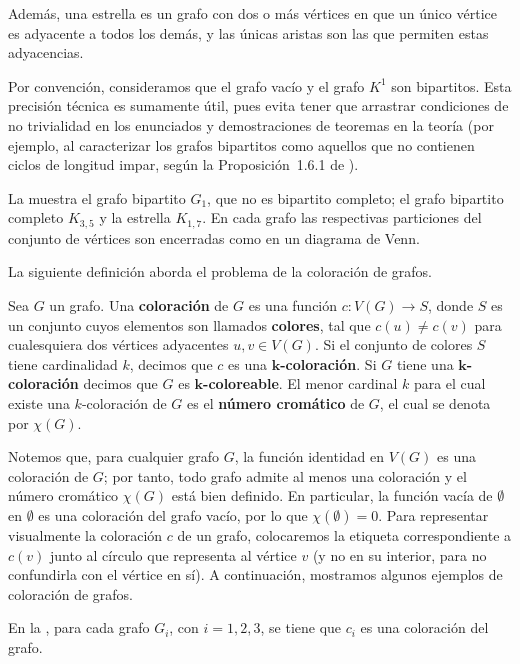 Además, una estrella es un grafo con dos o más vértices en que un único vértice es adyacente a todos los demás, y las únicas aristas son las que permiten estas adyacencias.
\begin{Obs}
    Por convención, consideramos que el grafo vacío y el grafo $K^1$ son bipartitos. Esta precisión técnica es sumamente útil, pues evita tener que arrastrar condiciones de no trivialidad en los enunciados y demostraciones de teoremas en la teoría (por ejemplo, al caracterizar los grafos bipartitos como aquellos que no contienen ciclos de longitud impar, según la Proposición~1.6.1 de \cite{diestel2017}).
\end{Obs}
\begin{Ejm}
   La  muestra el grafo bipartito $G_1$, que no es bipartito completo; el grafo bipartito completo $K_{3,5}$ y la estrella $K_{1,7}$. En cada grafo las respectivas particiones del conjunto de vértices son encerradas como en un diagrama de Venn.
   
\end{Ejm}
La siguiente definición aborda el problema de la coloración de grafos.
\begin{Def}
   Sea $G$ un grafo. Una \textbf{coloración} de $G$ es una función $c: V(G) \to S$, donde $S$ es un conjunto cuyos elementos son llamados \textbf{colores}, tal que $c(u) \neq c(v)$ para cualesquiera dos vértices adyacentes $u, v \in V(G)$. Si el conjunto de colores $S$ tiene cardinalidad $k$, decimos que $c$ es una \textbf{$\bm{k}$-coloración}. Si $G$ tiene una \textbf{$\bm{k}$-coloración} decimos que $G$ es \textbf{$\bm{k}$-coloreable}. El menor cardinal $k$ para el cual existe una $k$-coloración de $G$ es el \textbf{número cromático} de $G$, el cual se denota por $\chi(G)$.
\end{Def}
Notemos que, para cualquier grafo $G$, la función identidad en $V(G)$ es una coloración de $G$; por tanto, todo grafo admite al menos una coloración y el número cromático $\chi(G)$ está bien definido. En particular, la función vacía de $\emptyset$ en $\emptyset$ es una coloración del grafo vacío, por lo que $\chi(\emptyset) = 0$. Para representar visualmente la coloración $c$ de un grafo, colocaremos la etiqueta correspondiente a $c(v)$ junto al círculo que representa al vértice $v$ (y no en su interior, para no confundirla con el vértice en sí). A continuación, mostramos algunos ejemplos de coloración de grafos.
\begin{Ejm}
   En la , para cada grafo $G_i$, con $i=1,2,3$, se tiene que $c_i$ es una coloración del grafo.
   
\end{Ejm}
